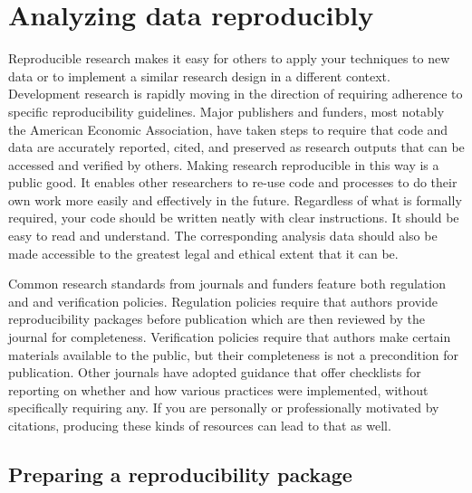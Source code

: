\section{Analyzing data reproducibly}

Reproducible research makes it easy
for others to apply your techniques to new data
or to implement a similar research design in a different context.
Development research is rapidly moving in the direction of requiring adherence
to specific reproducibility guidelines.
Major publishers and funders, most notably the American Economic Association,
have taken steps to require that code and data
are accurately reported, cited, and preserved as research outputs
that can be accessed and verified by others.
Making research reproducible in this way is a public good.
It enables other researchers to re-use code and processes
to do their own work more easily and effectively in the future.
Regardless of what is formally required,
your code should be written neatly with clear instructions.
It should be easy to read and understand.
The corresponding analysis data should also be made accessible
to the greatest legal and ethical extent that it can be.

Common research standards from journals and funders feature both
regulation and and verification policies.
Regulation policies require that authors
provide reproducibility packages before publication
which are then reviewed by the journal for completeness.
Verification policies require that authors
make certain materials available to the public,
but their completeness is not a precondition for publication.
Other journals have adopted guidance that offer checklists
for reporting on whether and how various practices were implemented,
without specifically requiring any.
If you are personally or professionally motivated by citations,
producing these kinds of resources can lead to that as well.


\subsection{Preparing a reproducibility package}

